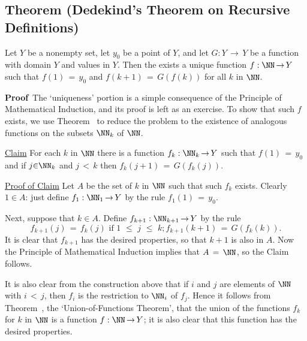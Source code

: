 {\V

        \subsection{\small{{\bf Theorem}} (Dedekind's Theorem on Recursive Definitions)}
        \label{ThmA40.100}

        Let $Y$ be a nonempty set, let $y_{0}$ be a point of $Y$, and let $G:Y \,{\rightarrow}\, Y$ be a function with domain $Y$ and values in $Y$.
    Then the exists a unique function $f:{\NN} \,{\rightarrow}\, Y$ such that $f(1) \,=\, y_{0}$ and $f(k+1) \,=\, G(f(k))$ for all $k$ in ${\NN}$.

\V

        {\bf Proof}\,  The `uniqueness' portion is a simple consequence of the Principle of Mathematical Induction, and its proof is left as an exercise.
        To show that such $f$ exists, we use Theorem~ to reduce the problem to the existence of analogous functions on the subsets ${\NN}_{k}$ of ${\NN}$.

\V

        \underline{Claim} For each $k$ in ${\NN}$ there is a function $f_{k}:{\NN}_{k} \,{\rightarrow}\, Y$
    such that $f(1) \,=\, y_{0}$ and if $j{\in}{\NN}_{k}$ and $j\,<\,k$ then $f_{k}(j+1) \,=\, G(f_{k}(j))$.

        \underline{Proof of Claim} Let $A$ be the set of $k$ in ${\NN}$ such that such $f_{k}$ exists.
    Clearly $1{\in}A$: just define $f_{1}:{\NN}_{1} \,{\rightarrow}\, Y$ by the rule $f_{1}(1) \,=\, y_{0}$.

        Next, suppose that $k{\in}A$. Define $f_{k+1}:{\NN}_{k+1} \,{\rightarrow}\, Y$ by the rule
        \begin{displaymath}
        f_{k+1}(j) \,=\, f_{k}(j) \mbox{ if $1\,\,{\leq}\,\,j\,\,{\leq}\,\,k$};
        f_{k+1}(k+1) \,=\, G(f_{k}(k)).
        \end{displaymath}
    It is clear that $f_{k+1}$ has the desired properties, so that $k+1$ is also in $A$.
    Now the Principle of Mathematical Induction implies that $A \,=\, {\NN}$, so the Claim follows.

    It is also clear from the construction above that if $i$ and $j$ are elements of ${\NN}$ with $i\,<\,j$, then $f_{i}$ is the restriction to ${\NN}_{i}$ of $f_{j}$.
    Hence it follows from Theorem~, the `Union-of-Functions Theorem',
    that the union of the functions $f_{k}$ for $k$ in ${\NN}$ is a function $f:{\NN} \,{\rightarrow}\, Y$;
    it is also clear that this function has the desired properties.

}
